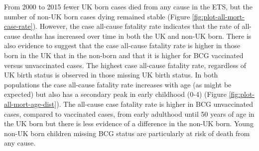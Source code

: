 \documentclass[11pt,twoside]{bristolthesis}
\begin{document}
  From 2000 to 2015 fewer UK born cases died from any cause in the ETS, but the number of non-UK born cases dying remained stable (Figure \ref{fig:plot-all-mort-case-rate}). However, the case all-cause fatality rate indicates that the rate of all-cause deaths has increased over time in both the UK and non-UK born. There is also evidence to suggest that the case all-cause fatality rate is higher in those born in the UK that in the non-born and that it is higher for BCG vaccinated versus unvaccinated cases. The highest case all-cause fatality rate, regardless of UK birth status is observed in those missing UK birth status. In both populations the case all-cause fatality rate increases with age (as might be expected) but also has a secondary peak in early childhood (0-4) (Figure \ref{fig:plot-all-mort-age-dist}). The all-cause case fatality rate is higher in BCG unvaccinated cases, compared to vaccinated cases, from early adulthood until 50 years of age in the UK born but there is less evidence of a difference in the non-UK born. Young non-UK born children missing BCG status are particularly at risk of death from any cause.
\end{document}
